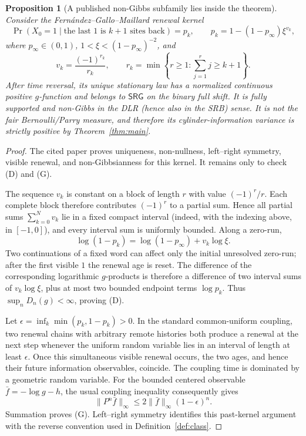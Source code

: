 \documentclass[11pt]{article}
\newtheorem{proposition}[theorem]{Proposition}
\theoremstyle{definition}
\theoremstyle{remark}
\begin{document}
\begin{proposition}[A published non-Gibbs subfamily lies inside the theorem]
\label{prop:non-gibbs-inside}
Consider the Fern\'andez--Gallo--Maillard renewal kernel
\[
 \Pr(X_0=1\mid\text{the last $1$ is $k+1$ sites back})=p_k,
 \qquad
 p_k=1-(1-p_\infty)\xi^{v_k},
\]
where $p_\infty\in(0,1)$,
$1<\xi<(1-p_\infty)^{-2}$, and
\[
 v_k=\frac{(-1)^{r_k}}{r_k},\qquad
 r_k=\min\left\{r\ge1:\sum_{j=1}^rj\ge k+1\right\}.
\]
After time reversal, its unique stationary law has a normalized continuous
positive $g$-function and belongs to $\mathsf{SRG}$ on the binary full
shift.  It is fully supported and non-Gibbs in the DLR (hence also in the
SRB) sense.  It is not the fair Bernoulli/Parry measure, and therefore its
cylinder-information variance is strictly positive by
Theorem~\ref{thm:main}.
\end{proposition}

\begin{proof}
The cited paper proves uniqueness, non-nullness, left--right symmetry,
visible renewal, and non-Gibbsianness for this kernel.  It remains only to
check (D) and (G).

The sequence $v_k$ is constant on a block of length $r$ with value
$(-1)^r/r$.  Each complete block therefore contributes $(-1)^r$ to a
partial sum.  Hence all partial sums $\sum_{k=0}^{N}v_k$ lie in a fixed
compact interval (indeed, with the indexing above, in $[-1,0]$), and every
interval sum is uniformly bounded.  Along a zero-run,
\[
 \log(1-p_k)=\log(1-p_\infty)+v_k\log\xi.
\]
Two continuations of a fixed word can affect only the initial unresolved
zero-run; after the first visible $1$ the renewal age is reset.  The
difference of the corresponding logarithmic $g$-products is therefore a
difference of two interval sums of $v_k\log\xi$, plus at most two bounded
endpoint terms $\log p_k$.  Thus $\sup_nD_n(g)<\infty$, proving (D).

Let $\epsilon=\inf_k\min(p_k,1-p_k)>0$.  In the standard common-uniform
coupling, two renewal chains with arbitrary remote histories both produce
a renewal at the next step whenever the uniform random variable lies in
an interval of length at least $\epsilon$.  Once this simultaneous visible
renewal occurs, the two ages, and hence their future information
observables, coincide.  The coupling time is dominated by a geometric
random variable.  For the bounded centered observable $\bar f=-\log g-h$, the
usual coupling inequality consequently gives
\[
 \|P^n\bar f\|_\infty\le 2\|\bar f\|_\infty(1-\epsilon)^n.
\]
Summation proves (G).  Left--right symmetry identifies this past-kernel
argument with the reverse convention used in Definition~\ref{def:class}.
\end{proof}
\end{document}
